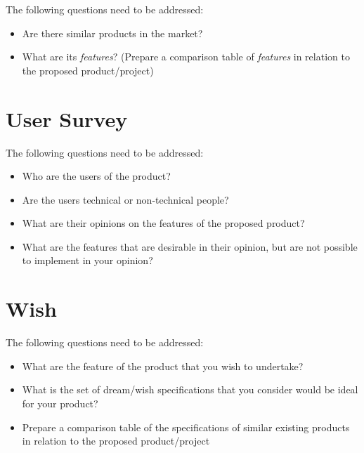 The following questions need to be addressed:
\begin{itemize}
\item Are there similar products in the market?
\item What are its \emph{features}? (Prepare a comparison table of \emph{features}
in relation to the proposed product/project)
\end{itemize}

\section{User Survey}

The following questions need to be addressed:
\begin{itemize}
\item Who are the users of the product?
\item Are the users technical or non-technical people?
\item What are their opinions on the features of the proposed product?
\item What are the features that are desirable in their opinion, but are
not possible to implement in your opinion?
\end{itemize}

\section{Wish}

The following questions need to be addressed:
\begin{itemize}
\item What are the feature of the product that you wish to undertake?
\item What is the set of dream/wish specifications that you consider would
be ideal for your product?
\item Prepare a comparison table of the specifications of similar existing
products in relation to the proposed product/project
\end{itemize}

